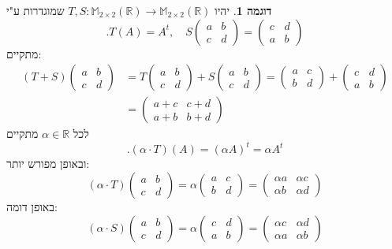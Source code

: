 \documentclass[12pt]{report}
\theoremstyle{plain}
\theoremstyle{definition}
\newtheorem{example}{דוגמה}[chapter]
\newcommand{\R}{\mathbb{R}}
\newcommand{\M}{\mathbb{M}}
\newcommand{\0}{\mathbf{0}}
\begin{document}
\begin{example}
יהיו 
$T,S:\M_{2\times 2}(\R)\to \M_{2\times 2}(\R)$
שמוגדרות ע"י
$$
.T(A)=A^t,\quad S\begin{pmatrix}a & b\\c & d\end{pmatrix}=\begin{pmatrix}c & d\\a & b\end{pmatrix}
$$
מתקיים:
$$
\begin{aligned}
(T+S)\begin{pmatrix}a & b\\c & d\end{pmatrix}&=T\begin{pmatrix}a & b\\c & d\end{pmatrix}+S\begin{pmatrix}a & b\\c & d\end{pmatrix}=\begin{pmatrix}a & c\\b & d\end{pmatrix}+\begin{pmatrix}c & d\\a & b\end{pmatrix}\\
&=\begin{pmatrix}a+c & c+d\\a+b & b+d\end{pmatrix}
\end{aligned}
$$
לכל
$\alpha\in\R$
מתקיים
$$
.(\alpha\cdot T)(A)=(\alpha A)^t=\alpha A^t
$$
ובאופן מפורש יותר:
$$
(\alpha\cdot T)\begin{pmatrix}a & b\\c & d\end{pmatrix}=\alpha\begin{pmatrix}a &c\\b & d\end{pmatrix}=\begin{pmatrix}\alpha a & \alpha c\\\alpha b & \alpha d\end{pmatrix}
$$
באופן דומה:
$$
(\alpha\cdot S)\begin{pmatrix}a & b\\c & d\end{pmatrix}=\alpha\begin{pmatrix}c & d\\a & b\end{pmatrix}=\begin{pmatrix}\alpha c & \alpha d\\\alpha a & \alpha b\end{pmatrix}
$$

\end{example}
\end{document}
